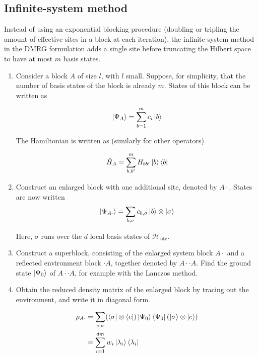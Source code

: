 \subsection{Infinite-system method}

 
Instead of using an exponential blocking procedure (doubling or tripling the
amount of effective sites in a block at each iteration), the infinite-system
method in the DMRG formulation adds a single site before truncating the Hilbert
space to have at most $m$ basis states.

\begin{enumerate}
  \item \label{step1} Consider a block $A$ of size $l$, with $l$ small. Suppose, for
  simplicity, that the number of basis states of the block is already
  $m$. States of this block can be written as
 
  \begin{equation}  
    \ket{\Psi_A} = \sum_{b = 1}^{m} c_{i} \ket{b}
  \end{equation}

  The Hamiltonian is written as (similarly for other operators)

  \begin{equation}
    \hat{H}_{A} = \sum_{b, b'}^{m} H_{b b'} \ket{b} \bra{b}
  \end{equation}

  \item Construct an enlarged block with one additional site, denoted by $A
  \cdot$. States are now written
  \begin{equation}
    \ket{\Psi_{A\cdot}} = \sum_{b, \sigma} c_{b, \sigma} \ket{b} \otimes \ket{\sigma}
  \end{equation}

  Here, $\sigma$ runs over the $d$ local basis states of $\mathcal{H}_{\text{site}}$.

  \item Construct a superblock, consisting of the enlarged system block $A
  \cdot$ and a reflected environment block $\cdot A$, together denoted by $A \cdot
  \cdot A$. Find the ground state $\ket{\Psi_0}$ of $A \cdot \cdot A$, for example
  with the Lanczos method.

  \item Obtain the reduced density matrix of the enlarged block by tracing out
  the environment, and write it in diagonal form.

  \begin{equation}
  \begin{aligned}
    \rho_{A \cdot} & = \sum_{e, \sigma} (\bra{\sigma} \otimes \bra{e}) \ket{\Psi_0} \bra{\Psi_0} (\ket{\sigma} \otimes \ket{e}) \\
    & = \sum_{i = 1}^{d m} w_{i} \ket{\lambda_i} \bra{\lambda_i}
  \end{aligned}
  \end{equation}


\end{enumerate}
